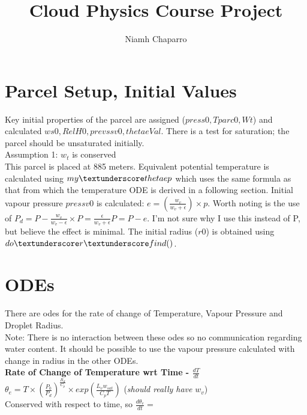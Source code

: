 \documentclass[11pt]{article} %
\title{Cloud Physics Course Project}
\author{Niamh Chaparro}
\begin{document}
\maketitle

\section{Parcel Setup, Initial Values}

Key initial properties of the parcel are assigned ($press0, Tparc0, Wt$) and calculated $ws0, RelH0, prevssv0, thetaeVal$.  There is a test for saturation; the parcel should be unsaturated initially.\\

Assumption 1: $w_{t}$  is conserved\\

This parcel is placed at 885 meters. Equivalent potential temperature is calculated using $my \textunderscore thetaep$ which uses the same formula as that from which the temperature ODE is derived in a following section.  Initial vapour pressure $pressv0$ is calculated: $e = \left( \frac{w_{v}}{w_{v} + \epsilon } \right) \times p $.   Worth noting is the use of  $P_{d} = P - \frac{w_{v}}{w_{v} - \epsilon} \times P = \frac{\epsilon}{w_{v} + \epsilon} P = P - e$.  I'm not sure why I use this instead of P, but believe the effect is minimal.  The initial radius ($r0$) is obtained using $do \textunderscore r \textunderscore find()$. 

\section{ODEs} 

There are odes for the rate of change of Temperature, Vapour Pressure and Droplet Radius.\\

Note: There is no interaction between these odes so no communication regarding water content.  It should be possible to use the vapour pressure calculated with change in radius in the other ODEs.\\

{\bf Rate of Change of Temperature wrt Time - $\frac{dT}{dt}$}\\

$\theta_{e} = T \times (\frac{P_{0}}{P_{d}})^{\frac{R_{d}}{C_{p}}}\times exp(\frac{L_{v}w_{sat}}{C_{p}T})$ (\emph{should really have} $w_{v}$)\\

Conserved with respect to time, so $\frac{d \theta_{e}}{dt} = $\\
\end{document}

